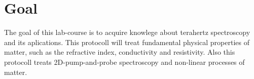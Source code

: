 \chapter{Goal}
\label{cha:goal}
The goal of this lab-course is to acquire knowlege about terahertz spectroscopy and its aplications. This protocoll will treat fundamental physical properties of matter, such as 
the refractive index, conductivity and resistivity. Also this protocoll treats 2D-pump-and-probe spectroscopy and non-linear processes of matter.

